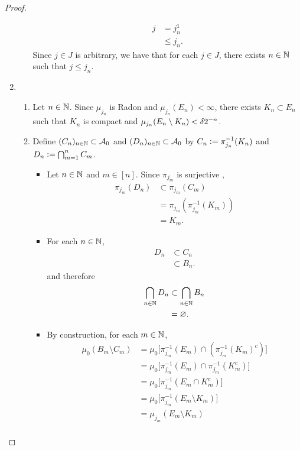 \documentclass{book}
\begin{document}
\begin{proof}
\begin{enumerate}
\begin{itemize}
			\begin{align*}
				j
				& = j^1_n \\
				& \leq j_n.
			\end{align*}
			Since $j \in J$ is arbitrary, we have that for each $j \in J$, there exists $n \in \mathbb{N}$ such that $j \leq j_n$. 
		\end{itemize}
		\item
		\begin{enumerate}
			\item Let $n \in \mathbb{N}$. Since $\mu_{j_n}$ is Radon and $\mu_{j_n}(E_n) < \infty$, there exists $K_n \subset E_n$ such that $K_n$ is compact and $\mu_{j_n}(E_n \setminus K_n) < \delta2^{-n}$.
			\item Define $(C_n)_{n \in \mathbb{N}} \subset \mathcal{A}_0$ and $(D_n)_{n \in \mathbb{N}} \subset \mathcal{A}_0$ by $C_n \vcentcolon= \pi_{j_n}^{-1}(K_n)$ and $D_n \vcentcolon= \bigcap_{m=1}^n C_m$. 
			\begin{itemize}
				\item Let $n \in \mathbb{N}$ and $m \in [n]$. Since $\pi_{j_m}$ is surjective , 
				\begin{align*}
					\pi_{j_m}(D_n)
					& \subset \pi_{j_m}(C_m) \\
					& = \pi_{j_m}(\pi_{j_m}^{-1}(K_m)) \\
					& = K_m. 
				\end{align*}
				\item For each $n \in \mathbb{N}$, 
				\begin{align*}
					D_n 
					& \subset C_n \\
					& \subset B_n.
				\end{align*} 
				and therefore 
				\begin{align*}
					\bigcap\limits_{n \in \mathbb{N}} D_n 
					& \subset \bigcap\limits_{n \in \mathbb{N}} B_n \\
					& = \varnothing.
				\end{align*} 
				\item By construction, for each $m \in \mathbb{N}$, 
				\begin{align*}
					\mu_0(B_m \setminus C_m)
					& = \mu_0 \bigg[ \pi_{j_m}^{-1}(E_m) \cap (\pi_{j_m}^{-1}(K_m)^c) \bigg] \\
					& = \mu_0 \bigg[ \pi_{j_m}^{-1}(E_m) \cap \pi_{j_m}^{-1}(K_m^c) \bigg] \\
					& = \mu_0 \bigg[ \pi_{j_m}^{-1}(E_m \cap K_m^c) \bigg] \\
					& = \mu_0 \bigg[ \pi_{j_m}^{-1}(E_m \setminus K_m) \bigg] \\
					& = \mu_{j_m}(E_m \setminus K_m) \\

\end{align*}
\end{itemize}
\end{enumerate}
\end{enumerate}
\end{proof}
\end{document}
